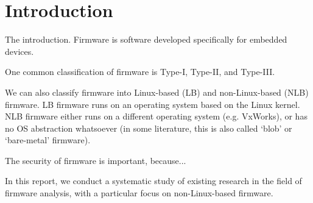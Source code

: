 \section{Introduction}
The introduction.
Firmware is software developed specifically for embedded devices.

One common classification of firmware is Type-I, Type-II, and Type-III.

We can also classify firmware into Linux-based (LB) and non-Linux-based (NLB) firmware.
LB firmware runs on an operating system based on the Linux kernel.
NLB firmware either runs on a different operating system (e.g. VxWorks), or has no OS abstraction whatsoever (in some literature, this is also called `blob' or `bare-metal' firmware).

The security of firmware is important, because...

In this report, we conduct a systematic study of existing research in the field of firmware analysis, with a particular focus on non-Linux-based firmware.



